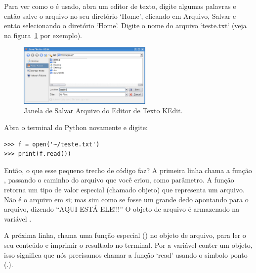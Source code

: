 \begin{LINUX}
Para ver como o  é usado, abra um editor de texto, digite algumas palavras e então salve o arquivo no seu diretório `Home', clicando em Arquivo, Salvar e então selecionando o diretório `Home'. Digite o nome do arquivo `teste.txt` (veja na figura~\ref{fig19} por exemplo).

\begin{figure}
\begin{center}
\includegraphics[width=65mm]{eps/figure19.eps}
\end{center}
\caption{Janela de Salvar Arquivo do Editor de Texto KEdit.}\label{fig19}
\end{figure}

Abra o terminal do Python novamente e digite:

\begin{listing}
\begin{verbatim}
>>> f = open('~/teste.txt')
>>> print(f.read())
\end{verbatim}
\end{listing}

\end{LINUX}

Então, o que esse pequeno trecho de código faz? A primeira linha chama a função , passando o caminho do arquivo que você criou, como parâmetro. A função retorna um tipo de valor especial (chamado objeto) que representa um arquivo. Não é o arquivo em si; mas sim como se fosse um grande dedo apontando para o arquivo, dizendo ``AQUI ESTÁ ELE!!!'' O objeto de arquivo é armazenado na variável .
\par
A próxima linha, chama uma função especial () no objeto de arquivo, para ler o seu conteúdo e imprimir o resultado no terminal. Por a variável  conter um objeto, isso significa que nós precisamos chamar a função `read' usando o símbolo ponto (.).


